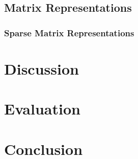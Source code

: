 \documentclass[authoryearcitations]{UoYCSproject}
\begin{document}
\section{Matrix Representations}
\subsection{Sparse Matrix Representations}


\chapter{Discussion}

\chapter{Evaluation}

\chapter{Conclusion}


\end{document}

